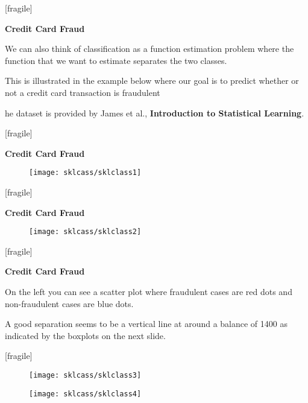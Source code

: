 \documentclass[MASTER.tex]{subfiles}
\begin{document}
 
 [fragile]
  
\textbf{Credit Card Fraud}
 
\item We can also think of classification as a function estimation problem where the function that we want to estimate separates the two classes. 
\item This is illustrated in the example below where our goal is to predict whether or not a credit card transaction is fraudulent
\item he dataset is provided by James et al., \textbf{Introduction to Statistical Learning}.
 

 

 [fragile]
  
\vspace{-1cm}
\textbf{Credit Card Fraud}
\begin{figure}
\centering
\texttt{[image: sklcass/sklclass1]}

\end{figure}

 
 [fragile]
  
\textbf{Credit Card Fraud}
\begin{figure}
\centering
\texttt{[image: sklcass/sklclass2]}

\end{figure}

 

 [fragile]
  
 \textbf{Credit Card Fraud}
  
\item  On the left you can see a scatter plot where fraudulent cases are red dots and non-fraudulent cases are blue dots. 
\item A good separation seems to be a vertical line at around a balance of 1400 as indicated by the boxplots on the next slide.
  
 

 

 [fragile]
 
 \begin{figure}
\centering
\texttt{[image: sklcass/sklclass3]}

\end{figure}

 
 

 
\begin{figure}
\centering
\texttt{[image: sklcass/sklclass4]}

\end{figure}
 
\end{document}
